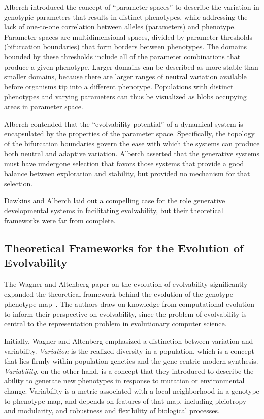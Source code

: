 \documentclass[PhD]{msu-thesis}
\begin{document}
Alberch introduced the concept of “parameter spaces” to describe the variation in genotypic parameters that results in distinct phenotypes, while addressing the lack of one-to-one correlation between alleles (parameters) and phenotype. Parameter spaces are multidimensional spaces, divided by parameter thresholds (bifurcation boundaries) that form borders between phenotypes. The domains bounded by these thresholds include all of the parameter combinations that produce a given phenotype. Larger domains can be described as more stable than smaller domains, because there are larger ranges of neutral variation available before organisms tip into a different phenotype. Populations with distinct phenotypes and varying parameters can thus be visualized as blobs occupying areas in parameter space.

Alberch contended that the “evolvability potential” of a dynamical system is encapsulated by the properties of the parameter space. Specifically, the topology of the bifurcation boundaries govern the ease with which the systems can produce both neutral and adaptive variation. Alberch asserted that the generative systems must have undergone selection that favors those systems that provide a good balance between exploration and stability, but provided no mechanism for that selection.

Dawkins and Alberch laid out a compelling case for the role generative developmental systems in facilitating evolvability, but their theoretical frameworks were far from complete.


\subsection{Theoretical Frameworks for the Evolution of Evolvability}
The Wagner and Altenberg paper on the evolution of evolvability significantly expanded the theoretical framework behind the evolution of the genotype-phenotype map~\cite{gunter_p._wagner_perspective:_1996}. The authors draw on knowledge from computational evolution to inform their perspective on evolvability, since the problem of evolvability is central to the representation problem in evolutionary computer science. 

Initially, Wagner and Altenberg emphasized a distinction between variation and variability. \textit{Variation} is the realized diversity in a population, which is a concept that lies firmly within population genetics and the gene-centric modern synthesis. \textit{Variability}, on the other hand, is a concept that they introduced to describe the ability to generate new phenotypes in response to mutation or environmental change. Variability is a metric associated with a local neighborhood in a genotype to phenotype map, and depends on features of that map, including pleiotropy and modularity, and robustness and flexibility of biological processes.
\end{document}
